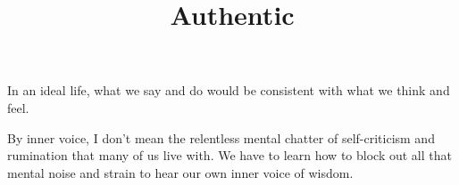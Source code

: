 \documentclass[ebook,12pt,oneside,openany]{memoir}
\begin{document}
\title{Authentic}
\maketitle

In an ideal life, what we say and do would be consistent with what we think and feel.

By inner voice, I don't mean the relentless mental chatter of self-criticism and rumination that many of us live with.
We have to learn how to block out all that mental noise and strain to hear our own inner voice of wisdom.
\end{document}
